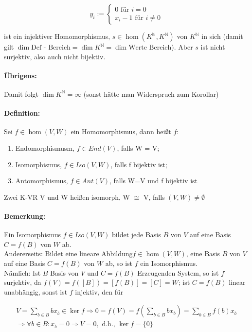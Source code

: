 		\begin{equation*}
		y_i :={
		\begin{cases}
		0 \text{ für } i = 0\\
		x_i-1 \text{ für } i \neq 0
		\end{cases}}
		\end{equation*}
			
	ist ein injektiver Homomorphismus, $s\in \hom(K^\mathbb{N},K^\mathbb{N})$ von $K^\mathbb{N}$ in sich (damit gilt $\dim \text{Def - Bereich} = \dim K^\mathbb{N}= \dim \text{Werte Bereich}$). Aber $s$ ist nicht surjektiv, also auch nicht bijektiv.
	
	\paragraph{Übrigens: }
		Damit folgt $\dim K^\mathbb{N} =\infty$ (sonst hätte man Widerspruch zum Korollar)
		
	\paragraph{Definition: }
		Sei $f\in \hom(V,W)$ ein Homomorphismus, dann heißt $f$:
			\begin{enumerate}
				\item Endomorphismusm, $f\in End(V)$, falls W = V;
				\item Isomorphismus, $f\in Iso(V,W)$, falls f bijektiv ist;
				\item Antomorphismus, $f\in Ant(V)$, falls W=V und f bijektiv ist
			\end{enumerate}
		Zwei K-VR V und W heißen isomorph, W $\cong$ V, falls $(V,W) \neq \emptyset$
	\paragraph{Bemerkung: }
			
			Ein Isomorphismus $f\in Iso(V,W)$ bildet jede Basis $B$ von $V$ auf eine Basis $C= f(B)$ von $W$ ab.\\
			Andererseits: Bildet eine lineare Abbildung$f\in \hom(V,W)$, eine Basis $B$ von $V$ auf eine Basis $C = f(B)$ von $W$ ab, so ist $f$ ein Isomorphismus.\\
			Nämlich: Ist $B$ Basis von $V$ und $ C = f(B)$ Erzeugenden System, so ist $f$ surjektiv, da $f(V) = f ([B]) = [f(B)] = [C] = W$; ist $C =f(B)$ linear unabhängig, sonst ist $f$ injektiv, den für
			
	\begin{gather*}
	V = \sum_{b\in B} bx_b \in \ker f \Rightarrow 0 = f(V) = f(\sum_{b\in B}bx_b) = \sum_{b\in B}f(b)x_b\\
	\Rightarrow \forall b \in B: x_b = 0 \Rightarrow V = 0, \text{ d.h., } \ker f=\{{0}\}
	\end{gather*}
			
